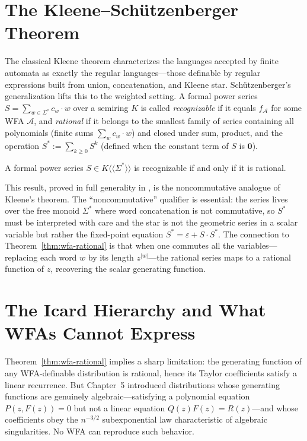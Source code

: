 \section{The Kleene--Schützenberger Theorem}

The classical Kleene theorem characterizes the languages accepted by finite automata as exactly the regular languages---those definable by regular expressions built from union, concatenation, and Kleene star. Schützenberger's generalization lifts this to the weighted setting. A formal power series $S = \sum_{w \in \Sigma^*} c_w \cdot w$ over a semiring $K$ is called \emph{recognizable} if it equals $f_\mathcal{A}$ for some WFA $\mathcal{A}$, and \emph{rational} if it belongs to the smallest family of series containing all polynomials (finite sums $\sum_{w} c_w \cdot w$) and closed under sum, product, and the operation $S^* := \sum_{k \ge 0} S^k$ (defined when the constant term of $S$ is $\mathbf{0}$).

\begin{theorem}
A formal power series $S \in K\langle\!\langle \Sigma^* \rangle\!\rangle$ is recognizable if and only if it is rational.
\end{theorem}

This result, proved in full generality in \cite{BerstelReutenauer2011}, is the noncommutative analogue of Kleene's theorem. The ``noncommutative'' qualifier is essential: the series lives over the free monoid $\Sigma^*$ where word concatenation is not commutative, so $S^*$ must be interpreted with care and the star is not the geometric series in a scalar variable but rather the fixed-point equation $S^* = \varepsilon + S \cdot S^*$. The connection to Theorem~\ref{thm:wfa-rational} is that when one commutes all the variables---replacing each word $w$ by its length $z^{|w|}$---the rational series maps to a rational function of $z$, recovering the scalar generating function.

\section{The Icard Hierarchy and What WFAs Cannot Express}

Theorem~\ref{thm:wfa-rational} implies a sharp limitation: the generating function of any WFA-definable distribution is rational, hence its Taylor coefficients satisfy a linear recurrence. But Chapter~5 introduced distributions whose generating functions are genuinely algebraic---satisfying a polynomial equation $P(z, F(z)) = 0$ but not a linear equation $Q(z) F(z) = R(z)$---and whose coefficients obey the $n^{-3/2}$ subexponential law characteristic of algebraic singularities. No WFA can reproduce such behavior.

